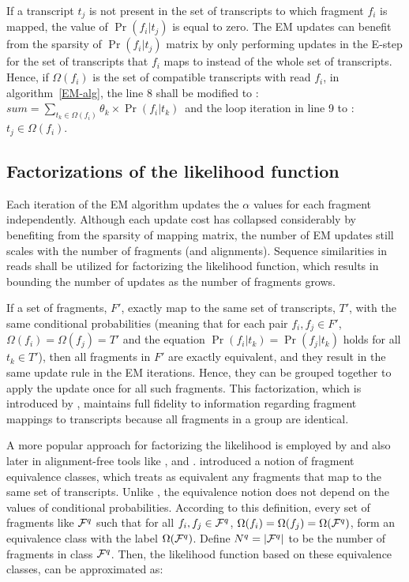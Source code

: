 If a transcript $t_j$ is not present in the set of transcripts to which 
fragment $f_i$ is mapped, the  value of $\Pr{(f_i|t_j)}$ is equal to zero. 
The EM updates can benefit from the sparsity of $\Pr{(f_i|t_j)}$ matrix by 
only performing updates in the E-step for the set of transcripts that $f_i$ maps 
to instead of the whole set of transcripts. Hence, if $\Omega{(f_i)}$ is the set 
of compatible transcripts with read $f_i$, in algorithm~\ref{EM-alg}, the line 8 
shall be modified to : 
$sum = \sum_{t_k \in \Omega{(f_i)}}{\theta_k \times  \Pr{(f_i|t_k)}}$\  
and the loop iteration in line 9 to :   $t_j \in \Omega{(f_i)}$.

\subsection{Factorizations of the likelihood function}\label{int:fact}

Each iteration of the EM algorithm updates the $\alpha$ values for each fragment 
independently. Although each update cost has collapsed considerably by benefiting 
from the sparsity of mapping matrix, the number of EM updates still scales with 
the number of fragments (and alignments). Sequence similarities in reads shall be 
utilized for factorizing the likelihood function, which results in bounding the 
number of updates as the number of fragments grows.
 
If a set of fragments, $F'$, exactly map to the same set of transcripts, $T'$, 
with the same conditional probabilities (meaning that for each pair 
$f_i,f_j \in F'$, $\Omega{(f_i)}=\Omega{(f_j)}=T'$ and the equation 
$\Pr{(f_i|t_k)}=\Pr{(f_j|t_k)}$ holds for all $t_k \in T'$), then all 
fragments in $F'$ are exactly equivalent, and they result in the same update rule 
in the EM iterations. Hence, they can be grouped together to apply the update once 
for all such fragments. This factorization, which is introduced by 
\isoem \citep{isoem}, maintains full fidelity to information regarding fragment 
mappings to transcripts because all fragments in a group are identical.

A more popular approach for factorizing the likelihood is employed by 
\mmseq \citep{Turro2011Haplotype} and also later in alignment-free tools 
like \sailfish \citep{Patro2014Sailfish}, \salmon \citep{Patro2017Salmon} 
and \kallisto \citep{Bray2016Kallisto}. \mmseq introduced a notion of fragment 
equivalence classes, which treats as equivalent any fragments that map to the 
same set of transcripts. Unlike \isoem, the equivalence notion does not depend 
on the values of conditional probabilities.  According to this definition, every 
set of fragments like $\mathcal{F}^q$ such that for all 
$f_i,f_j \in \mathcal{F}^q$, $\Omega{(f_i)}=\Omega{(f_j)}=\Omega{(\Frags^q)}$, 
form an equivalence class with the label $\Omega{(\Frags^q)}$. 
Define $N^q=|\mathcal{F}^q|$ to be the number of fragments in class $\mathcal{F}^q$. 
Then, the likelihood function based on these equivalence classes, can be 
approximated as:

